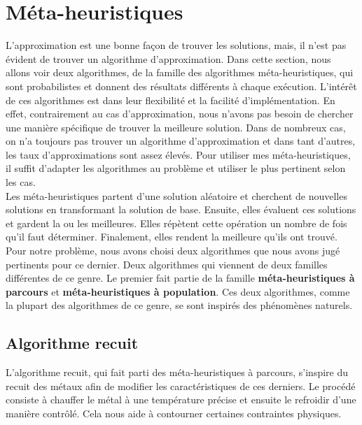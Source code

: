 \documentclass[11pt,french]{report}
\begin{document}
	\section{Méta-heuristiques\label{Méta-heuristiques}}
	L'approximation est une bonne façon de trouver les solutions, mais, il n'est pas évident de trouver un algorithme d'approximation. Dans cette section, nous allons voir deux algorithmes, de la famille des algorithmes méta-heuristiques, qui sont probabilistes et donnent des résultats différents à chaque exécution. L'intérêt de ces algorithmes est dans leur flexibilité et la facilité d'implémentation. En effet, contrairement au cas d'approximation, nous n'avons pas besoin de chercher une manière spécifique de trouver la meilleure solution. Dans de nombreux cas, on n'a toujours pas trouver un algorithme d'approximation et dans tant d'autres, les taux d'approximations sont assez élevés. Pour utiliser mes méta-heuristiques, il suffit d'adapter les algorithmes au problème et utiliser le plus pertinent selon les cas.\\
	
	Les méta-heuristiques partent d'une solution aléatoire et cherchent de nouvelles solutions en transformant la solution de base. Ensuite, elles évaluent ces solutions et gardent la ou les meilleures. Elles répètent cette opération un nombre de fois qu'il faut déterminer. Finalement, elles rendent la meilleure qu'ils ont trouvé.\\
	
	Pour notre problème, nous avons choisi deux algorithmes que nous avons jugé pertinents pour ce dernier. Deux algorithmes qui viennent de deux familles différentes de ce genre. Le premier fait partie de la famille \textbf{méta-heuristiques à parcours} et \textbf{méta-heuristiques à population}. Ces deux algorithmes, comme la plupart des algorithmes de ce genre, se sont inspirés des phénomènes naturels.
	
	\subsection{Algorithme recuit\label{recuit}}
	L'algorithme recuit, qui fait parti des méta-heuristiques à parcours, s'inspire du recuit des métaux afin de modifier les caractéristiques de ces derniers. Le procédé consiste à chauffer le métal à une température précise et ensuite le refroidir d'une manière contrôlé. Cela nous aide à contourner certaines contraintes physiques.\\
	
\end{document}
